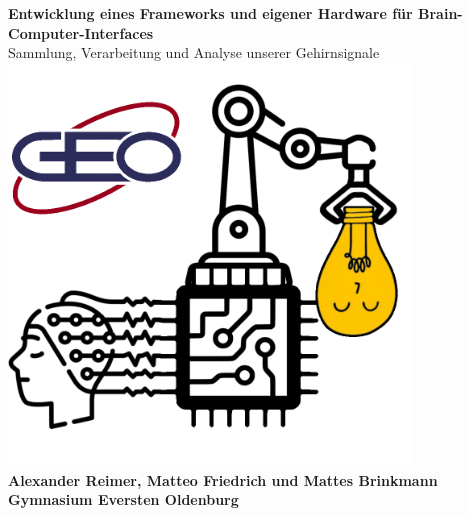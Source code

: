 \documentclass[10pt]{article}
\begin{document}






\thispagestyle{empty}

\vspace*{10mm}
\begin{center}
    {\Huge \textbf{\sansemph Entwicklung eines Frameworks und eigener Hardware für Brain-Computer-Interfaces}} \\[2mm]
    {\Large Sammlung, Verarbeitung und Analyse unserer Gehirnsignale} \\[4mm]
    \includegraphics[width=0.8\textwidth]{logo.png} \\[10mm]
    {\huge \textbf{Alexander Reimer, Matteo Friedrich und Mattes Brinkmann}} \\[1em]
    {\LARGE \textbf{Gymnasium Eversten Oldenburg}}
\end{center}

\newpage
{}

\tableofcontents
\end{document}
